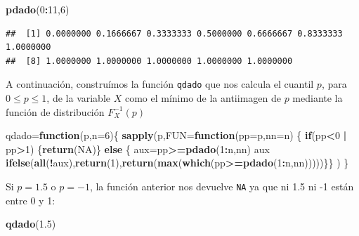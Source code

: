 \documentclass[]{book}
\newenvironment{Shaded}{\begin{snugshade}}{\end{snugshade}}
\newcommand{\ControlFlowTok}[1]{\textcolor[rgb]{0.13,0.29,0.53}{\textbf{#1}}}
\newcommand{\DataTypeTok}[1]{\textcolor[rgb]{0.13,0.29,0.53}{#1}}
\newcommand{\DecValTok}[1]{\textcolor[rgb]{0.00,0.00,0.81}{#1}}
\newcommand{\FloatTok}[1]{\textcolor[rgb]{0.00,0.00,0.81}{#1}}
\newcommand{\KeywordTok}[1]{\textcolor[rgb]{0.13,0.29,0.53}{\textbf{#1}}}
\newcommand{\NormalTok}[1]{#1}
\newcommand{\OperatorTok}[1]{\textcolor[rgb]{0.81,0.36,0.00}{\textbf{#1}}}
\newcommand{\OtherTok}[1]{\textcolor[rgb]{0.56,0.35,0.01}{#1}}
\newcommand{\StringTok}[1]{\textcolor[rgb]{0.31,0.60,0.02}{#1}}
\begin{document}
\begin{Shaded}
\begin{Highlighting}[]
\KeywordTok{pdado}\NormalTok{(}\DecValTok{0}\OperatorTok{:}\DecValTok{11}\NormalTok{,}\DecValTok{6}\NormalTok{)}
\end{Highlighting}
\end{Shaded}

\begin{verbatim}
##  [1] 0.0000000 0.1666667 0.3333333 0.5000000 0.6666667 0.8333333 1.0000000
##  [8] 1.0000000 1.0000000 1.0000000 1.0000000 1.0000000
\end{verbatim}

A continuación, construímos la función \texttt{qdado} que nos calcula el cuantil \(p\), para \(0\leq p\leq 1\), de la variable \(X\) como el mínimo de la antiimagen de \(p\) mediante la función de distribución \(F_X^{-1}(p)\)

\begin{Shaded}
\begin{Highlighting}[]
\NormalTok{qdado=}\ControlFlowTok{function}\NormalTok{(p,}\DataTypeTok{n=}\DecValTok{6}\NormalTok{)\{}
\KeywordTok{sapply}\NormalTok{(p,}\DataTypeTok{FUN=}\ControlFlowTok{function}\NormalTok{(}\DataTypeTok{pp=}\NormalTok{p,}\DataTypeTok{nn=}\NormalTok{n) }
\NormalTok{  \{}
  \ControlFlowTok{if}\NormalTok{(pp}\OperatorTok{<}\DecValTok{0} \OperatorTok{|}\StringTok{ }\NormalTok{pp}\OperatorTok{>}\DecValTok{1}\NormalTok{) \{}\KeywordTok{return}\NormalTok{(}\OtherTok{NA}\NormalTok{)\}}
  \ControlFlowTok{else}\NormalTok{ \{}
\NormalTok{  aux=pp}\OperatorTok{>=}\KeywordTok{pdado}\NormalTok{(}\DecValTok{1}\OperatorTok{:}\NormalTok{n,nn)}
\NormalTok{  aux}
  \KeywordTok{ifelse}\NormalTok{(}\KeywordTok{all}\NormalTok{(}\OperatorTok{!}\NormalTok{aux),}\KeywordTok{return}\NormalTok{(}\DecValTok{1}\NormalTok{),}\KeywordTok{return}\NormalTok{(}\KeywordTok{max}\NormalTok{(}\KeywordTok{which}\NormalTok{(pp}\OperatorTok{>=}\KeywordTok{pdado}\NormalTok{(}\DecValTok{1}\OperatorTok{:}\NormalTok{n,nn)))))\}\}}
\NormalTok{)}
\NormalTok{\}}
\end{Highlighting}
\end{Shaded}

Si \(p=1.5\) o \(p=-1\), la función anterior nos devuelve \texttt{NA} ya que ni 1.5 ni -1 están entre 0 y 1:

\begin{Shaded}
\begin{Highlighting}[]
\KeywordTok{qdado}\NormalTok{(}\FloatTok{1.5}\NormalTok{)}
\end{Highlighting}
\end{Shaded}
\end{document}
